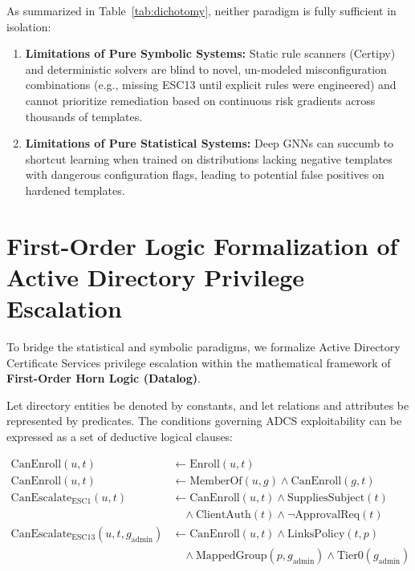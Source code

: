As summarized in Table~\ref{tab:dichotomy}, neither paradigm is fully sufficient in isolation:
\begin{enumerate}
    \item \textbf{Limitations of Pure Symbolic Systems:} Static rule scanners (Certipy) and deterministic solvers are blind to novel, un-modeled misconfiguration combinations (e.g., missing ESC13 until explicit rules were engineered) and cannot prioritize remediation based on continuous risk gradients across thousands of templates.
    \item \textbf{Limitations of Pure Statistical Systems:} Deep GNNs can succumb to shortcut learning when trained on distributions lacking negative templates with dangerous configuration flags, leading to potential false positives on hardened templates.
\end{enumerate}

\section{First-Order Logic Formalization of Active Directory Privilege Escalation}
To bridge the statistical and symbolic paradigms, we formalize Active Directory Certificate Services privilege escalation within the mathematical framework of \textbf{First-Order Horn Logic (Datalog)}.

Let directory entities be denoted by constants, and let relations and attributes be represented by predicates. The conditions governing ADCS exploitability can be expressed as a set of deductive logical clauses:

\begin{equation}
\begin{aligned}
\text{CanEnroll}(u, t) &\leftarrow \text{Enroll}(u, t) \\
\text{CanEnroll}(u, t) &\leftarrow \text{MemberOf}(u, g) \wedge \text{CanEnroll}(g, t) \\
\text{CanEscalate}_{\text{ESC1}}(u, t) &\leftarrow \text{CanEnroll}(u, t) \wedge \text{SuppliesSubject}(t) \\
&\quad \wedge \text{ClientAuth}(t) \wedge \neg \text{ApprovalReq}(t) \\
\text{CanEscalate}_{\text{ESC13}}(u, t, g_{\text{admin}}) &\leftarrow \text{CanEnroll}(u, t) \wedge \text{LinksPolicy}(t, p) \\
&\quad \wedge \text{MappedGroup}(p, g_{\text{admin}}) \wedge \text{Tier0}(g_{\text{admin}})
\end{aligned}
\end{equation}

